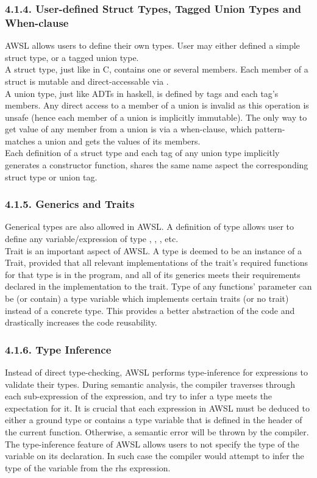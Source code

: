 \documentclass[10pt,a4paper]{report}
\begin{document}
  \subsubsection*{4.1.4. User-defined Struct Types, Tagged Union Types and When-clause}
  AWSL allows users to define their own types. User may either defined a simple struct type, or a tagged union type.\\
  A struct type, just like  in C, contains one or several members. Each member of a struct is mutable and
  direct-accessable via .\\
  A union type, just like ADTs in haskell, is defined by tags and each tag's members. Any direct access to a member of a union is
  invalid as this operation is unsafe (hence each member of a union is implicitly immutable). The only way to get value of any member
  from a union is via a when-clause, which pattern-matches a union and gets the values of its members.\\
  Each definition of a struct type and each tag of any union type implicitly generates a constructor function, shares the same name aspect
  the corresponding struct type or union tag.

  \subsubsection*{4.1.5. Generics and Traits}
  Generical types are also allowed in AWSL. A definition of type  allows user to define any variable/expression 
  of type , , , etc.\\
  Trait is an important aspect of AWSL. A type is deemed to be an instance of a Trait, provided that all relevant implementations of
  the trait's required functions for that type is in the program, and all of its generics meets their requirements declared
  in the implementation to the trait. Type of any functions' parameter can be (or contain) a type variable 
  which implements certain traits (or no trait) instead of a concrete type. This provides a better abstraction of the code and 
  drastically increases the code reusability. 

  \subsubsection*{4.1.6. Type Inference}
  Instead of direct type-checking, AWSL performs type-inference for expressions to validate their types. During semantic analysis, the
  compiler traverses through each sub-expression of the expression, and try to infer a type meets the expectation for it. 
  It is crucial that each expression in AWSL must be deduced to either a ground type or contains a type variable that is defined in the 
  header of the current function. Otherwise, a semantic error will be thrown by the compiler.\\
  The type-inference feature of AWSL allows users to not specify the type of the variable on its declaration. In such case the compiler would 
  attempt to infer the type of the variable from the rhs expression.
\end{document}
